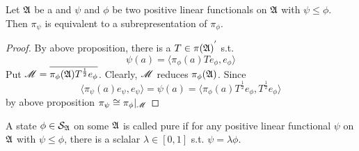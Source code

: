 \documentclass[a4paper,11pt]{report}
\begin{document}
\begin{cor}
	Let $\mathfrak{A}$ be a \Cs and $\psi$ and $\phi$ be two positive linear functionals on $\mathfrak{A}$ with $\psi \leqslant \phi$. Then $\pi_{\psi}$ is equivalent to a subrepresentation of $\pi_{\phi}$.
\end{cor}
\begin{proof}
	By above proposition, there is a $T \in {\pi(\mathfrak{A})}^{'}$ s.t. 
	\begin{equation*}
		\psi(a) = \langle \pi_{\phi}(a)Te_{\phi}, e_{\phi} \rangle
	\end{equation*}
	Put $\mathscr{M} = \overline{\pi_{\phi}(\mathfrak{A})T^{\frac{1}{2}}e_{\phi}}$. Clearly, $\mathscr{M}$ reduces $\pi_{\phi}(\mathfrak{A})$. Since
	\begin{equation*}
		\langle \pi_{\psi}(a)e_{\psi}, e_{\psi} \rangle = \psi(a) = \langle \pi_{\phi}(a)T^{\frac{1}{2}}e_{\phi}, T^{\frac{1}{2}}e_{\phi} \rangle
	\end{equation*}
	by above proposition $\pi_{\psi} \cong \pi_{\phi}|_{\mathscr{M}}$
\end{proof}

\begin{defn}
	A state $\phi \in \mathcal{S}_{\mathfrak{A}}$ on some \Cs $\mathfrak{A}$ is called pure if for any positive linear functional $\psi$ on $\mathfrak{A}$ with $\psi \leqslant \phi$, there is a sclalar $\lambda \in [0,1]$ s.t. $\psi = \lambda \phi$.
\end{defn}
\end{document}

